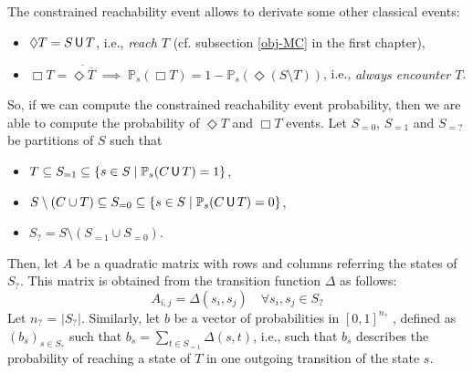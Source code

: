 The constrained reachability event allows to derivate some other classical events:
\begin{itemize}
  \item $\Diamond T = S \,\text{\sffamily U}\, T$, i.e., \textit{reach $T$} (cf. subsection \ref{obj-MC} in the first chapter),
  \item $\Box T =  \overline{\Diamond \overline{T}} \; \implies \; \mathbb{P}_s(\Box T) = 1 - \mathbb{P}_s (\Diamond (S \setminus T))$, i.e., \textit{always encounter $T$}.
\end{itemize}
So, if we can compute the constrained reachability event probability, then we are able to compute the probability of $\Diamond T$ and $\Box T$ events.
Let $S_{=0}$, $S_{=1}$ and $S_{=?}$ be partitions of $S$ such that
\begin{itemize}
  \item $T \subseteq S_{=1} \subseteq \{s \in S \; | \; \mathbb{P}_s(C \,\text{\sffamily U}\, T) = 1\}$,
  \item $S \setminus (C \cup T) \subseteq S_{=0} \subseteq \{ s \in S \; | \; \mathbb{P}_s(C \,\text{\sffamily U}\, T) = 0 \}$,
  \item $S_? = S \setminus (S_{=1} \cup S_{=0})$.
\end{itemize}
Then, let $A$ be a quadratic matrix with rows and columns referring the states of $S_?$. This matrix is obtained from the transition function $\Delta$ as follows:
\[
  A_{i, j} = \Delta(s_i, s_j) \quad \forall s_i, s_j \in S_?
\]
Let $n_?$ = $|S_?|$. Similarly, let $b$ be a vector of probabilities in $[0, 1]^{n_?}$ , defined as $(b_s)_{s \in S_?}$ such that $b_s = \sum_{t \in S_{=1}} \Delta(s, t)$, i.e., such that $b_s$ describes the probability of reaching a state of $T$ in one outgoing transition of the state $s$.

